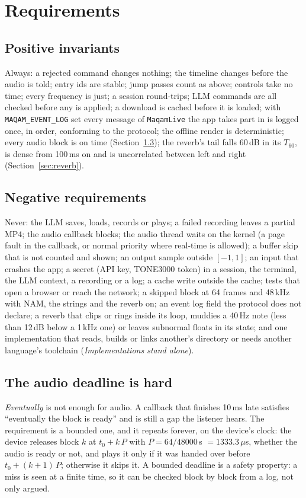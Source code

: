 \documentclass[11pt,oneside]{book}
\begin{document}
\chapter{Requirements}
\section{Positive invariants}
Always: a rejected command changes nothing; the timeline changes before the
audio is told; entry ids are stable; jump passes count as above; controls take
no time; every frequency is just; a session round-trips; LLM commands are all
checked before any is applied; a download is cached before it is loaded; with
\texttt{MAQAM\_EVENT\_LOG} set every message of \texttt{MaqamLive} the app takes
part in is logged once, in order, conforming to the protocol; the offline render
is deterministic; every audio block is on time (Section~\ref{sec:deadline});
the reverb's tail falls 60\,dB in its $T_{60}$, is dense from 100\,ms on and
is uncorrelated between left and right (Section~\ref{sec:reverb}).

\section{Negative requirements}
Never: the LLM saves, loads, records or plays; a failed recording leaves a
partial MP4; the audio callback blocks; the audio thread waits on the kernel (a
page fault in the callback, or normal priority where real-time is allowed); a
buffer skip that is not counted and shown; an output sample outside $[-1,1]$; an
input that crashes the app; a secret (API key, TONE3000 token) in a session, the
terminal, the LLM context, a recording or a log; a cache write outside the
cache; tests that open a browser or reach the network; a skipped block at 64
frames and 48\,kHz with NAM, the strings and the reverb on; an event log
field the protocol does not declare; a reverb that clips or rings inside its
loop, muddies a 40\,Hz note (less than 12\,dB below a 1\,kHz one) or leaves
subnormal floats in its state; and one implementation that reads, builds
or links another's directory or needs another language's toolchain
(\emph{Implementations stand alone}).

\section{The audio deadline is hard}\label{sec:deadline}
\emph{Eventually} is not enough for audio. A callback that finishes 10\,ms late
satisfies ``eventually the block is ready'' and is still a gap the listener
hears. The requirement is a bounded one, and it repeats forever, on the
device's clock: the device releases block $k$ at $t_0 + k\,P$ with
$P = 64/48000$\,s $= 1333.3\,\mu$s, whether the audio is ready or not, and
plays it only if it was handed over before $t_0 + (k+1)\,P$; otherwise it skips
it. A bounded deadline is a safety property: a miss is seen at a finite time,
so it can be checked block by block from a log, not only argued.
\end{document}
